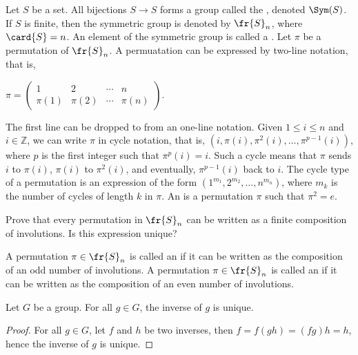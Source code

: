 \documentclass[10pt]{article}
\begin{document}
\begin{example}
    Let $S$ be a set. All bijections $S\to S$ forms a group called the , denoted $\Sym(S)$. If $S$ is finite, then the symmetric group is denoted by ${\fr{S}}_{n}$, where $\card{S}=n$. An element of the symmetric group is called a . Let $\pi$ be a permutation of ${\fr{S}}_{n}$. A permuatation can be expressed by two-line notation, that is, 
    \begin{center}
        $\pi=
        \begin{pmatrix}
            1 & 2 & \cdots & n \\
            \pi(1) & \pi(2) & \cdots & \pi(n)
        \end{pmatrix}$.
    \end{center}
    The first line can be dropped to from an one-line notation. Given $1\le i\le n$ and $i\in\mathbb{Z}$, we can write $\pi$ in cycle notation, that is, $(i,\pi(i),{\pi}^{2}(i),\ldots,{\pi}^{p-1}(i))$, where $p$ is the first integer such that ${\pi}^{p}(i)=i$. Such a cycle means that $\pi$ sends $i$ to $\pi(i)$, $\pi(i)$ to ${\pi}^{2}(i)$, and eventually, ${\pi}^{p-1}(i)$ back to $i$. The cycle type of a permutation is an expression of the form $({1}^{{m}_{1}},{2}^{{m}_{2}},\ldots,{n}^{{m}_{n}})$, where ${m}_{k}$ is the number of cycles of length $k$ in $\pi$. An  is a permutation $\pi$ such that ${\pi}^{2}=e$.
\end{example}
\begin{problem}
    Prove that every permutation in ${\fr{S}}_{n}$ can be written as a finite composition of involutions. Is this expression unique?
\end{problem}
\begin{definition}
    A permutation $\pi\in{\fr{S}}_{n}$ is called an  if it can be written as the composition of an odd number of involutions. A permutation $\pi\in{\fr{S}}_{n}$ is called an  if it can be written as the composition of an even number of involutions.
\end{definition}
\begin{proposition}
    Let $G$ be a group. For all $g\in G$, the inverse of $g$ is unique.
\end{proposition}
\begin{proof}
    For all $g\in G$, let $f$ and $h$ be two inverses, then $f=f(gh)=(fg)h=h$, hence the inverse of $g$ is unique.
\end{proof}
\par
\end{document}

